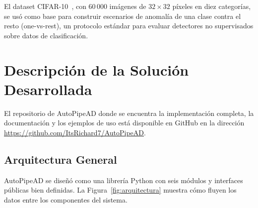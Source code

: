 \documentclass[conference,spanish]{IEEEtran}
\begin{document}
El dataset CIFAR-10~\cite{krizhevsky2009cifar}, con 60\,000 imágenes de
$32\times32$ píxeles en diez categorías, se usó como base para construir
escenarios de anomalía de una clase contra el resto
(one-vs-rest), un protocolo estándar para evaluar detectores no
supervisados sobre datos de clasificación.

\section{Descripción de la Solución Desarrollada}

El repositorio de AutoPipeAD donde se encuentra la implementación completa, la documentación y los ejemplos de uso está disponible en GitHub en la dirección \url{https://github.com/ItsRichard7/AutoPipeAD}.

\subsection{Arquitectura General}

AutoPipeAD se diseñó como una librería Python con seis módulos y interfaces
públicas bien definidas. La Figura~\ref{fig:arquitectura} muestra cómo
fluyen los datos entre los componentes del sistema.
\end{document}
